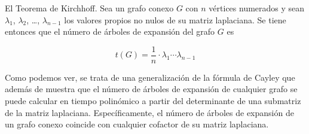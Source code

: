 \begin{theorem}
El Teorema de Kirchhoff. Sea un grafo conexo $G$ con $n$ vértices numerados y sean $\lambda_1$, $\lambda_2$, \dots, $\lambda_{n-1}$ los valores propios no nulos de su matriz laplaciana. Se tiene entonces que el número de árboles de expansión del grafo $G$ es

\begin{equation}
t(G) = \frac{1}{n} \cdot \lambda_1 \cdots \lambda_{n-1}
\end{equation}

Como podemos ver, se trata de una generalización de la fórmula de Cayley que además de muestra que el número de árboles de expansión de cualquier grafo se puede calcular en tiempo polinómico a partir del determinante de una submatriz de la matriz laplaciana. Específicamente, el número de árboles de expansión de un grafo conexo coincide con cualquier cofactor de su matriz laplaciana.
\end{theorem}

